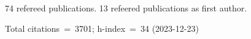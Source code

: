 74 refereed publications. 13 refeered publications as first author.

Total citations~=~3701; h-index~=~34 (2023-12-23)